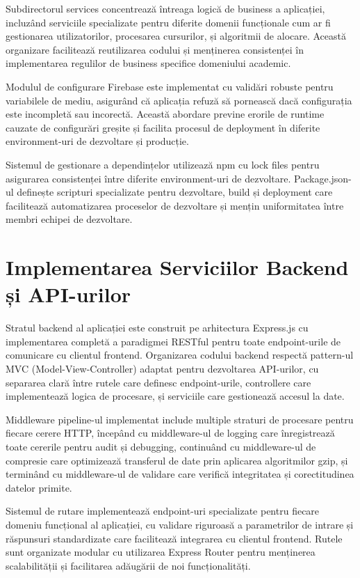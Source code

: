 \documentclass[12pt,a4paper]{report}
\begin{document}
Subdirectorul services concentrează întreaga logică de business a aplicației, incluzând serviciile specializate pentru diferite domenii funcționale cum ar fi gestionarea utilizatorilor, procesarea cursurilor, și algoritmii de alocare. Această organizare facilitează reutilizarea codului și menținerea consistenței în implementarea regulilor de business specifice domeniului academic.

Modulul de configurare Firebase este implementat cu validări robuste pentru variabilele de mediu, asigurând că aplicația refuză să pornească dacă configurația este incompletă sau incorectă. Această abordare previne erorile de runtime cauzate de configurări greșite și facilita procesul de deployment în diferite environment-uri de dezvoltare și producție.

Sistemul de gestionare a dependințelor utilizează npm cu lock files pentru asigurarea consistenței între diferite environment-uri de dezvoltare. Package.json-ul definește scripturi specializate pentru dezvoltare, build și deployment care facilitează automatizarea proceselor de dezvoltare și mențin uniformitatea între membri echipei de dezvoltare.

\section{Implementarea Serviciilor Backend și API-urilor}

Stratul backend al aplicației este construit pe arhitectura Express.js cu implementarea completă a paradigmei RESTful pentru toate endpoint-urile de comunicare cu clientul frontend. Organizarea codului backend respectă pattern-ul MVC (Model-View-Controller) adaptat pentru dezvoltarea API-urilor, cu separarea clară între rutele care definesc endpoint-urile, controllere care implementează logica de procesare, și serviciile care gestionează accesul la date.

Middleware pipeline-ul implementat include multiple straturi de procesare pentru fiecare cerere HTTP, începând cu middleware-ul de logging care înregistrează toate cererile pentru audit și debugging, continuând cu middleware-ul de compresie care optimizează transferul de date prin aplicarea algoritmilor gzip, și terminând cu middleware-ul de validare care verifică integritatea și corectitudinea datelor primite.

Sistemul de rutare implementează endpoint-uri specializate pentru fiecare domeniu funcțional al aplicației, cu validare riguroasă a parametrilor de intrare și răspunsuri standardizate care facilitează integrarea cu clientul frontend. Rutele sunt organizate modular cu utilizarea Express Router pentru menținerea scalabilității și facilitarea adăugării de noi funcționalități.
\end{document}
